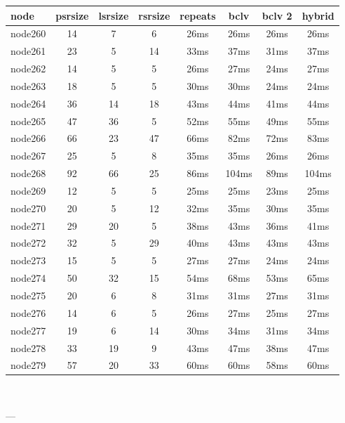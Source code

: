 \begin{tabular}{|l|c|c|c|c|c|c|c|}
\hline node & psrsize & lsrsize & rsrsize   & repeats & bclv & bclv 2 & hybrid\\
    \hline node260 & 14 & 7 & 6 & 26ms & 26ms & 26ms & 26ms\\
    \hline node261 & 23 & 5 & 14 & 33ms & 37ms & 31ms & 37ms\\
    \hline node262 & 14 & 5 & 5 & 26ms & 27ms & 24ms & 27ms\\
    \hline node263 & 18 & 5 & 5 & 30ms & 30ms & 24ms & 24ms\\
    \hline node264 & 36 & 14 & 18 & 43ms & 44ms & 41ms & 44ms\\
    \hline node265 & 47 & 36 & 5 & 52ms & 55ms & 49ms & 55ms\\
    \hline node266 & 66 & 23 & 47 & 66ms & 82ms & 72ms & 83ms\\
    \hline node267 & 25 & 5 & 8 & 35ms & 35ms & 26ms & 26ms\\
    \hline node268 & 92 & 66 & 25 & 86ms & 104ms & 89ms & 104ms\\
    \hline node269 & 12 & 5 & 5 & 25ms & 25ms & 23ms & 25ms\\
    \hline node270 & 20 & 5 & 12 & 32ms & 35ms & 30ms & 35ms\\
    \hline node271 & 29 & 20 & 5 & 38ms & 43ms & 36ms & 41ms\\
    \hline node272 & 32 & 5 & 29 & 40ms & 43ms & 43ms & 43ms\\
    \hline node273 & 15 & 5 & 5 & 27ms & 27ms & 24ms & 24ms\\
    \hline node274 & 50 & 32 & 15 & 54ms & 68ms & 53ms & 65ms\\
    \hline node275 & 20 & 6 & 8 & 31ms & 31ms & 27ms & 31ms\\
    \hline node276 & 14 & 6 & 5 & 26ms & 27ms & 25ms & 27ms\\
    \hline node277 & 19 & 6 & 14 & 30ms & 34ms & 31ms & 34ms\\
    \hline node278 & 33 & 19 & 9 & 43ms & 47ms & 38ms & 47ms\\
    \hline node279 & 57 & 20 & 33 & 60ms & 60ms & 58ms & 60ms\\

\hline
\end{tabular} \

---


